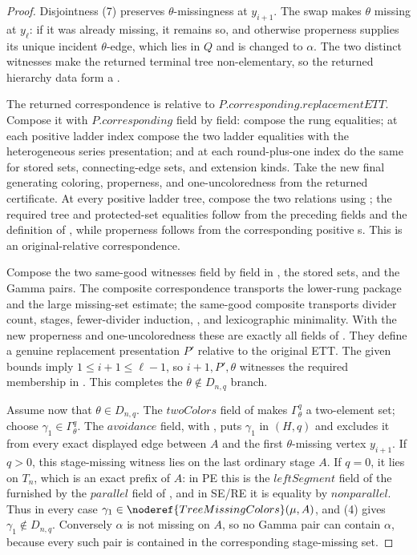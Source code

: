 \begin{proof}
Disjointness (7) preserves \(\theta\)-missingness at \(y_{i+1}\).  The
swap makes \(\theta\) missing at \(y_\ell\): if it was already missing,
it remains so, and otherwise properness supplies its unique incident
\(\theta\)-edge, which lies in \(Q\) and is changed to \(\alpha\).  The
two distinct witnesses make the returned terminal tree non-elementary,
so the returned hierarchy data form a
.

The returned correspondence is relative to
\(P.\mathit{corresponding}.\mathit{replacementETT}\).  Compose it with
\(P.\mathit{corresponding}\) field by field: compose the rung equalities;
at each positive ladder index compose the two ladder equalities with the
heterogeneous series presentation; and at each round-plus-one index do the
same for stored sets, connecting-edge sets, and extension kinds.  Take the
new final generating coloring, properness, and one-uncoloredness from the
returned certificate.  At every positive ladder tree, compose the two
 relations using ; the required tree
and protected-set equalities follow from the preceding fields and the
definition of , while properness follows
from the corresponding positive s.  This is
an original-relative correspondence.

Compose the two same-good witnesses field by field in
, the stored sets, and the Gamma pairs.  The
composite correspondence transports the lower-rung package and the large
missing-set estimate; the same-good composite transports divider count,
stages, fewer-divider induction, ,
and lexicographic minimality.  With the new properness and
one-uncoloredness these are exactly all fields of
.  They define a genuine
replacement presentation \(P'\) relative to the original ETT.  The given
bounds imply \(1\le i+1\le\ell-1\), so
\(i+1,P',\theta\) witnesses the required membership in
.  This completes the
\(\theta\notin D_{n,q}\) branch.

Assume now that \(\theta\in D_{n,q}\).  The \(\mathit{twoColors}\) field
of  makes
\(\Gamma^q_\theta\) a two-element set; choose
\(\gamma_1\in\Gamma^q_\theta\).  The \(\mathit{avoidance}\) field, with
, puts \(\gamma_1\) in
\((H,q)\) and excludes it from every
exact displayed edge between \(A\) and the first \(\theta\)-missing
vertex \(y_{i+1}\).  If \(q>0\), this stage-missing witness lies on the
last ordinary stage \(A\).  If \(q=0\), it lies on \(T_n\), which is an
exact prefix of \(A\): in PE this is the \(\mathit{leftSegment}\) field of
the  furnished by the
\(\mathit{parallel}\) field of , and in SE/RE it
is equality by \(\mathit{nonparallel}\).  Thus in every case
\(\gamma_1\in\noderef{TreeMissingColors}(\mu,A)\), and (4) gives
\(\gamma_1\notin D_{n,q}\).  Conversely \(\alpha\) is not missing on
\(A\), so no Gamma pair can contain \(\alpha\), because every such pair
is contained in the corresponding stage-missing set.


\end{proof}
